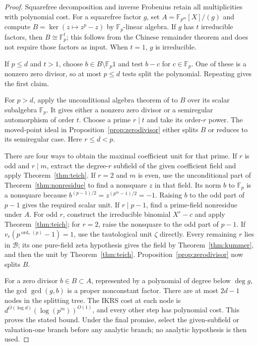\documentclass[11pt]{article}
\newcommand{\F}{\mathbb F}
\newcommand{\ord}{\operatorname{ord}}
\theoremstyle{definition}
\theoremstyle{remark}
\begin{document}
\begin{proof}
Squarefree decomposition and inverse Frobenius retain
all multiplicities with polynomial cost.  For a
squarefree factor $g$, set
$A=\F_{p^m}[X]/(g)$ and compute
$B=\ker(z\mapsto z^p-z)$ by $\F_p$-linear algebra.
If $g$ has $t$ irreducible factors, then $B\cong\F_p^t$;
this follows from the Chinese remainder theorem and
does not require those factors as input.
When $t=1$, $g$ is irreducible.

If $p\leq d$ and $t>1$, choose $b\in B\setminus\F_p1$
and test $b-c$ for $c\in\F_p$.  One of these is a
nonzero zero divisor, so at most $p\leq d$ tests
split the polynomial.  Repeating gives the first claim.

For $p>d$, apply the unconditional algebra theorem of
\citet[Theorem~5.8, author pp.~28--29]{IKRS2012} to
$B$ over its scalar subalgebra $\F_p$.
It gives either a nonzero zero divisor or a semiregular
automorphism of order $t$.  Choose a prime $r\mid t$
and take its order-$r$ power.  The moved-point ideal
in Proposition~\ref{prop:zerodivisor} either splits
$B$ or reduces to its semiregular case.
Here $r\leq d<p$.

There are four ways to obtain the maximal coefficient
unit for that prime.  If $r$ is odd and $r\mid m$,
extract the degree-$r$ subfield of the given coefficient
field and apply Theorem~\ref{thm:teich}.
If $r=2$ and $m$ is even, use the unconditional part of
Theorem~\ref{thm:nonresidue} to find a nonsquare $z$ in
that field. Its norm $b$ to $\F_p$ is a nonsquare because
$b^{(p-1)/2}=z^{(p^m-1)/2}=-1$.
Raising $b$ to the odd part of $p-1$ gives the required
scalar unit.
If $r\mid p-1$, find a prime-field nonresidue under
$A$. For odd $r$, construct the irreducible binomial
$X^r-c$ and apply Theorem~\ref{thm:teich}; for $r=2$,
raise the nonsquare to the odd part of $p-1$.
If $v_r(p^{\ord_r(p)}-1)=1$, use the tautological
unit $\zeta$ directly.
Every remaining $r$ lies in $\mathcal B$; its one
pure-field zeta hypothesis gives the field by
Theorem~\ref{thm:kummer}, and then the unit by
Theorem~\ref{thm:teich}.
Proposition~\ref{prop:zerodivisor} now splits $B$.

For a zero divisor $b\in B\subset A$, represented by
a polynomial of degree below $\deg g$, the gcd
$\gcd(g,b)$ is a proper nonconstant factor.
There are at most $2d-1$ nodes in the splitting tree.
The IKRS cost at each node is
$d^{O(\log d)}(\log(p^m))^{O(1)}$, and every other
step has polynomial cost.  This proves the stated
bound.  Under the final promise, select the
given-subfield or valuation-one branch before any
analytic branch; no analytic hypothesis is then used.
\end{proof}
\end{document}
